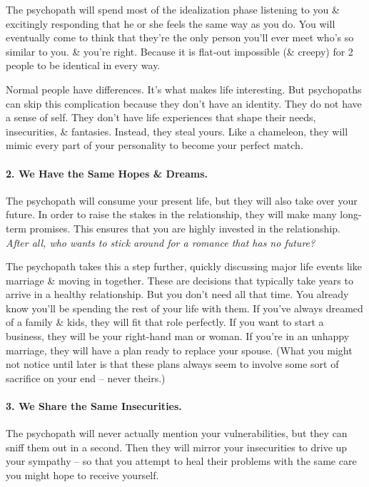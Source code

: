 \documentclass{article}
\numberwithin{equation}{section}
\begin{document}
The psychopath will spend most of the idealization phase listening to you \& excitingly responding that he or she feels the same way as you do. You will eventually come to think that they're the only person you'll ever meet who's so similar to you. \& you're right. Because it is flat-out impossible (\& creepy) for 2 people to be identical in every way.

Normal people have differences. It's what makes life interesting. But psychopaths can skip this complication because they don't have an identity. They do not have a sense of self. They don't have life experiences that shape their needs, insecurities, \& fantasies. Instead, they steal yours. Like a chameleon, they will mimic every part of your personality to become your perfect match.

\paragraph{2. We Have the Same Hopes \& Dreams.} The psychopath will consume your present life, but they will also take over your future. In order to raise the stakes in the relationship, they will make many long-term promises. This ensures that you are highly invested in the relationship. \textit{After all, who wants to stick around for a romance that has no future?}

The psychopath takes this a step further, quickly discussing major life events like marriage \& moving in together. These are decisions that typically take years to arrive in a healthy relationship. But you don't need all that time. You already know you'll be spending the rest of your life with them. If you've always dreamed of a family \& kids, they will fit that role perfectly. If you want to start a business, they will be your right-hand man or woman. If you're in an unhappy marriage, they will have a plan ready to replace your spouse. (What you might not notice until later is that these plans always seem to involve some sort of sacrifice on your end -- never theirs.)

\paragraph{3. We Share the Same Insecurities.} The psychopath will never actually mention your vulnerabilities, but they can sniff them out in a second. Then they will mirror your insecurities to drive up your sympathy -- so that you attempt to heal their problems with the same care you might hope to receive yourself.
\end{document}
